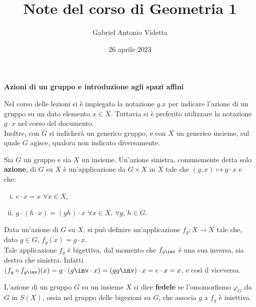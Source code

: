 \documentclass[11pt]{article}
\title{\textbf{Note del corso di Geometria 1}}
\author{Gabriel Antonio Videtta}
\date{26 aprile 2023}
\begin{document}
	
	\maketitle
	
	\begin{center}
		\Large \textbf{Azioni di un gruppo e introduzione agli spazi affini}
	\end{center}

	
	\begin{note}
		Nel corso delle lezioni si è impiegata la notazione $g.x$ per indicare
		l'azione di un gruppo su un dato elemento $x \in X$. Tuttavia si è
		preferito utilizzare la notazione $g \cdot x$ nel corso del documento. \\
		
		Inoltre, con $G$ si indicherà un generico gruppo, e con $X$ un
		generico insieme, sul quale $G$ agisce, qualora non indicato diversamente.
	\end{note}

	\begin{definition} 
		Sia $G$ un gruppo e sia $X$ un insieme. Un'azione sinistra, comunemente detta solo \textbf{azione}, di $G$
		su $X$ è un'applicazione da $G \times X$ in $X$ tale
		che $(g, x) \mapsto g \cdot x$ e che:
		
		\begin{enumerate}[(i)]
			\item $e \cdot x = x$ $\forall x \in X$,
			\item $g \cdot (h \cdot x) = (gh) \cdot x$ $\forall x \in X$, $\forall g$, $h \in G$.
		\end{enumerate}
	\end{definition}

	\begin{remark}\nl
		\li Data un'azione di $G$ su $X$, si può definire un'applicazione
		$f_g : X \to X$ tale che, dato $g \in G$, $f_g(x) = g \cdot x$. \\
		\li Tale applicazione $f_g$ è bigettiva, dal momento che $f_{g\inv}$ è una sua
		inversa, sia destra che sinistra. Infatti $(f_g \circ f_{g\inv})(x) =
		g \cdot (g\inv \cdot x) = (g g\inv) \cdot x = e \cdot x = x$, e così il viceversa. 
	\end{remark}

	\begin{definition}
		L'azione di un gruppo $G$ su un insieme $X$ si dice \textbf{fedele} se
		l'omomorfismo $\varphi_G$ da $G$ in $S(X)$, ossia nel gruppo delle bigezioni su $G$, che
		associa $g$ a $f_g$ è iniettiva.
	\end{definition}
	
\end{document}
